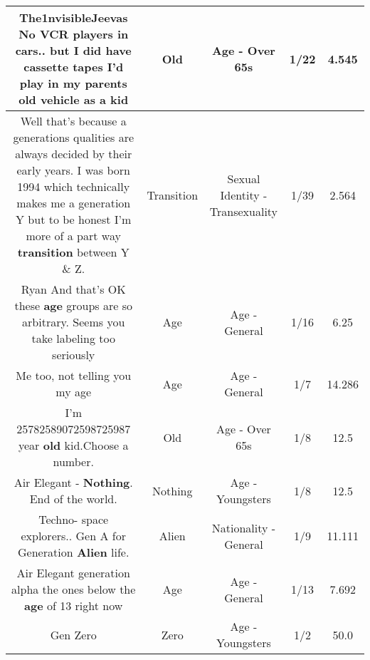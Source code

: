 \documentclass[11pt]{article}
\newlength\mylength
\begin{document}
\begin{center}
\begin{longtable}{|C{.65\mylength}|C{.30\mylength}|C{.12\mylength}|C{.12\mylength}|C{.12\mylength}|}
  \small The1nvisibleJeevas No VCR players in cars.. but I did have cassette tapes I'd play in my parents \textbf{old} vehicle as a kid\normalsize   & Old & Age - Over 65s & 1/22 & 4.545 \\  \hline
  \small Well that's because a generations qualities are always decided by their early years. I was born 1994 which technically makes me a generation Y but to be honest I'm more of a part way \textbf{transition} between Y \& Z.\normalsize   & Transition & Sexual Identity - Transexuality & 1/39 & 2.564 \\  \hline
  \small Ryan And that's OK these \textbf{age} groups are so arbitrary. Seems you take labeling too seriously\normalsize   & Age & Age - General & 1/16 & 6.25 \\  \hline
  \small Me too, not telling you my age\normalsize   & Age & Age - General & 1/7 & 14.286 \\  \hline
  \small I'm 25782589072598725987 year \textbf{old} kid.Choose a number.\normalsize   & Old & Age - Over 65s & 1/8 & 12.5 \\  \hline
  \small Air Elegant - \textbf{Nothing}. End of the world.\normalsize   & Nothing & Age - Youngsters & 1/8 & 12.5 \\  \hline
  \small Techno- space explorers.. Gen A for Generation \textbf{Alien} life.\normalsize   & Alien & Nationality - General & 1/9 & 11.111 \\  \hline
  \small Air Elegant generation alpha the ones below the \textbf{age} of 13 right now\normalsize   & Age & Age - General & 1/13 & 7.692 \\  \hline
  \small Gen Zero\normalsize   & Zero & Age - Youngsters & 1/2 & 50.0 \\  \hline

\end{longtable}
\end{center}
\end{document}
